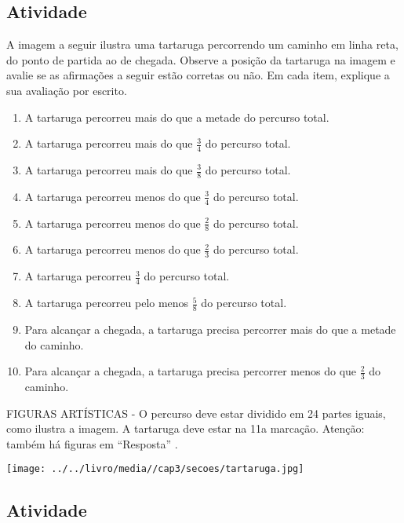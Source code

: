 \documentclass[a4,12pt]{book}
\begin{document}
\subsection{Atividade}

A imagem a seguir ilustra uma tartaruga percorrendo um caminho em linha reta, do ponto de partida ao de chegada. Observe a posição da tartaruga na imagem e avalie se as afirmações a seguir estão corretas ou não. Em cada item, explique a sua avaliação por escrito.
\begin{enumerate} [\quad a)] %
  \item     A tartaruga percorreu mais do que a metade do percurso total.
  \item     A tartaruga percorreu mais do que     $\frac{3}{4}$     do percurso total.
  \item     A tartaruga percorreu mais do que     $\frac{3}{8}$     do percurso total.
  \item     A tartaruga percorreu menos do que     $\frac{3}{4}$     do percurso total.
  \item     A tartaruga percorreu menos do que     $\frac{2}{8}$     do percurso total.
  \item     A tartaruga percorreu menos do que     $\frac{2}{3}$     do percurso total.
  \item     A tartaruga percorreu     $\frac{3}{4}$     do percurso total.
  \item     A tartaruga percorreu pelo menos     $\frac{5}{8}$     do percurso total.
  \item     Para alcançar a chegada, a tartaruga precisa percorrer mais do que a metade do caminho.
  \item     Para alcançar a chegada, a tartaruga precisa percorrer menos do que     $\frac{2}{3}$     do caminho.
\end{enumerate} %


\begin{imagem*}[breakable]{}{}   FIGURAS ARTÍSTICAS - O percurso deve estar dividido em 24 partes iguais, como ilustra a imagem. A tartaruga deve estar na 11a marcação. Atenção: também há figuras em   ``Resposta''  .  
  
    \texttt{[image: ../../livro/media//cap3/secoes/tartaruga.jpg]}  
\end{imagem*}

\subsection{Atividade}
\end{document}
